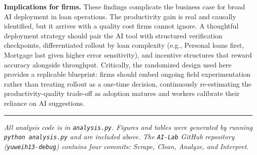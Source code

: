 \documentclass[12pt]{article}
\begin{document}
\textbf{Implications for firms.}
These findings complicate the business case for broad AI deployment in loan operations.
The productivity gain is real and causally identified, but it arrives with a quality
cost firms cannot ignore. A thoughtful deployment strategy should pair the AI tool
with structured verification checkpoints, differentiated rollout by loan complexity
(e.g., Personal loans first, Mortgage last given higher error sensitivity), and
incentive structures that reward accuracy alongside throughput. Critically, the
randomized design used here provides a replicable blueprint: firms should embed
ongoing field experimentation rather than treating rollout as a one-time decision,
continuously re-estimating the productivity-quality trade-off as adoption matures
and workers calibrate their reliance on AI suggestions.

\vspace{2em}\hrule\vspace{0.5em}
\footnotesize
\textit{All analysis code is in \texttt{analysis.py}. Figures and tables were generated
by running \texttt{python analysis.py} and are included above. The \texttt{AI-Lab}
GitHub repository (\texttt{yuweih13-debug}) contains four commits: Scrape, Clean,
Analyze, and Interpret.}
\end{document}
